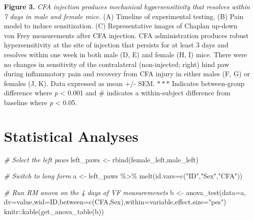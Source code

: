 \documentclass[
]{book}
\newenvironment{Shaded}{\begin{snugshade}}{\end{snugshade}}
\newcommand{\AttributeTok}[1]{\textcolor[rgb]{0.77,0.63,0.00}{#1}}
\newcommand{\CommentTok}[1]{\textcolor[rgb]{0.56,0.35,0.01}{\textit{#1}}}
\newcommand{\FunctionTok}[1]{\textcolor[rgb]{0.00,0.00,0.00}{#1}}
\newcommand{\NormalTok}[1]{#1}
\newcommand{\OtherTok}[1]{\textcolor[rgb]{0.56,0.35,0.01}{#1}}
\newcommand{\SpecialCharTok}[1]{\textcolor[rgb]{0.00,0.00,0.00}{#1}}
\newcommand{\StringTok}[1]{\textcolor[rgb]{0.31,0.60,0.02}{#1}}
\begin{document}
\textbf{Figure 3.} \emph{CFA injection produces mechanical hypersensitivity that resolves within 7 days in male and female mice.} (A) Timeline of experimental testing. (B) Pain model to induce sensitization. (C) Representative images of Chaplan up-down von Frey measurements after CFA injection. CFA administration produces robust hypersensitivity at the site of injection that persists for at least 3 days and resolves within one week in both male (D, E) and female (H, I) mice. There were no changes in sensitivity of the contralateral (non-injected; right) hind paw during inflammatory pain and recovery from CFA injury in either males (F, G) or females (J, K). Data expressed as mean +/- SEM. \(***\) Indicates between-group difference where \emph{p} \textless{} 0.001 and \# indicates a within-subject difference from baseline where \emph{p} \textless{} 0.05.

\hypertarget{statistical-analyses-2}{%
\section*{Statistical Analyses}\label{statistical-analyses-2}}

\begin{Shaded}
\begin{Highlighting}[]
\CommentTok{\# Select the left paws}
\NormalTok{left\_paws }\OtherTok{\textless{}{-}} \FunctionTok{rbind}\NormalTok{(female\_left,male\_left)}

\CommentTok{\# Switch to long form}
\NormalTok{a }\OtherTok{\textless{}{-}}\NormalTok{ left\_paws }\SpecialCharTok{\%\textgreater{}\%} 
  \FunctionTok{melt}\NormalTok{(}\AttributeTok{id.vars=}\FunctionTok{c}\NormalTok{(}\StringTok{"ID"}\NormalTok{,}\StringTok{"Sex"}\NormalTok{,}\StringTok{"CFA"}\NormalTok{))}

\CommentTok{\# Run RM anova on the 4 days of VF measuremenets}
\NormalTok{b }\OtherTok{\textless{}{-}} \FunctionTok{anova\_test}\NormalTok{(}\AttributeTok{data=}\NormalTok{a, }\AttributeTok{dv=}\NormalTok{value,}\AttributeTok{wid=}\NormalTok{ID,}\AttributeTok{between=}\FunctionTok{c}\NormalTok{(CFA,Sex),}\AttributeTok{within=}\NormalTok{variable,}\AttributeTok{effect.size=}\StringTok{"pes"}\NormalTok{)}
\NormalTok{knitr}\SpecialCharTok{::}\FunctionTok{kable}\NormalTok{(}\FunctionTok{get\_anova\_table}\NormalTok{(b))}
\end{Highlighting}
\end{Shaded}
\end{document}
